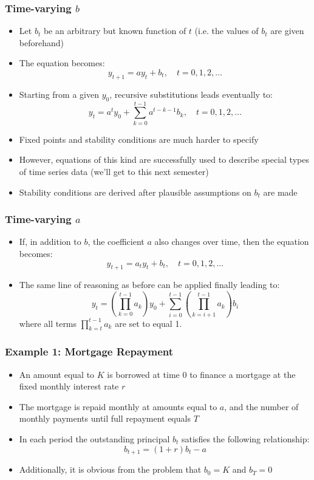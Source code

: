 \documentclass[10pt,usenames,dvipsnames]{beamer}
\theoremstyle{definition}
\begin{document}
\begin{frame}[fragile]
\frametitle{Time-varying $b$}
\begin{itemize}
	\item Let $b_{t}$ be an arbitrary but known function of $t$ (i.e. the values of $b_{t}$ are given beforehand)
	\item The equation becomes:
	\[
		y_{t+1} = ay_{t} + b_{t}, \quad t = 0,1,2,\ldots
	\]
	\item Starting from a given $y_{0}$, recursive substitutions leads eventually to:
	\[
		y_{t} = a^{t}y_{0} + \sum_{k=0}^{t-1}a^{t-k-1}b_{k}, \quad t = 0,1,2,\ldots
	\]
	\item Fixed points and stability conditions are much harder to specify
	\item However, equations of this kind are successfully used to describe special types of time series data (we'll get to this next semester)
	\item Stability conditions are derived after plausible assumptions on $b_{t}$ are made
\end{itemize}
\end{frame}

\begin{frame}[fragile]
\frametitle{Time-varying $a$}
\begin{itemize}
	\item If, in addition to $b$, the coefficient $a$ also changes over time, then the equation becomes:
	\[
		y_{t+1} = a_{t}y_{t} + b_{t}, \quad t = 0,1,2,\ldots
	\]
	\item The same line of reasoning as before can be applied finally leading to:
	\[
		y_{t} = \left(\prod_{k=0}^{t-1}a_{k}\right)y_{0} + \sum_{i=0}^{t-1}\left(\prod_{k=i+1}^{t-1}a_{k}\right)b_{i}
	\]
	where all terms $\displaystyle \prod_{k=t}^{t-1}a_{k}$ are set to equal 1.
\end{itemize}
\end{frame}

\begin{frame}[fragile]
\frametitle{Example 1: Mortgage Repayment}
\begin{itemize}
	\item An amount equal to $K$ is borrowed at time 0 to finance a mortgage at the fixed monthly interest rate $r$
	\item The mortgage is repaid monthly at amounts equal to $a$, and the number of monthly payments until full repayment equals $T$
	\item In each period the outstanding principal $b_{t}$ satisfies the following relationship:
	\[
		b_{t+1} = (1+r)b_{t} - a
	\]
	\item Additionally, it is obvious from the problem that $b_{0} = K$ and $b_{T} = 0$ 
\end{itemize}
\end{frame}
\end{document}
